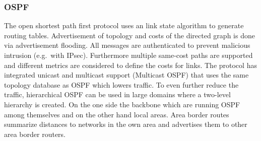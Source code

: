 \subsubsection*{OSPF}
The open shortest path first protocol uses an link state algorithm to generate routing tables.
Advertisement of topology and costs of the directed graph is done via advertisement flooding.
All messages are authenticated to prevent malicious intrusion (e.g.\ with IPsec).
Furthermore multiple same-cost paths are supported and different metrics are considered to define the costs for links.
The protocol has integrated unicast and multicast support (Multicast OSPF) that uses the same topology database as OSPF which lowers traffic.
To even further reduce the traffic, hierarchical OSPF can be used in large domains where a two-level hierarchy is created.
On the one side the backbone which are running OSPF among themselves and on the other hand local areas.
Area border routes summarize distances to networks in the own area and advertises them to other area border routers.
